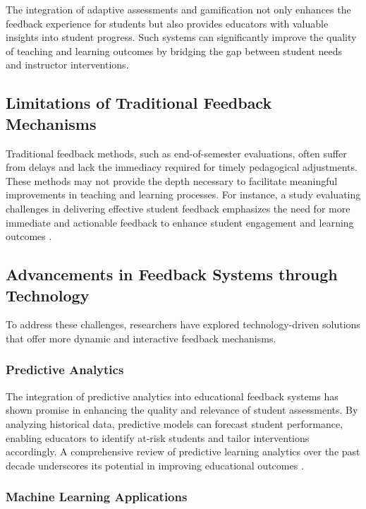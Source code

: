 \documentclass[conference]{IEEEtran}
\begin{document}
The integration of adaptive assessments and gamification not only enhances the feedback experience for students but also provides educators with valuable insights into student progress. Such systems can significantly improve the quality of teaching and learning outcomes by bridging the gap between student needs and instructor interventions.

\subsection{Limitations of Traditional Feedback Mechanisms}

Traditional feedback methods, such as end-of-semester evaluations, often suffer from delays and lack the immediacy required for timely pedagogical adjustments. These methods may not provide the depth necessary to facilitate meaningful improvements in teaching and learning processes. For instance, a study evaluating challenges in delivering effective student feedback emphasizes the need for more immediate and actionable feedback to enhance student engagement and learning outcomes \cite{article1}.

\subsection{Advancements in Feedback Systems through Technology}

To address these challenges, researchers have explored technology-driven solutions that offer more dynamic and interactive feedback mechanisms.

\subsubsection{Predictive Analytics}

The integration of predictive analytics into educational feedback systems has shown promise in enhancing the quality and relevance of student assessments. By analyzing historical data, predictive models can forecast student performance, enabling educators to identify at-risk students and tailor interventions accordingly. A comprehensive review of predictive learning analytics over the past decade underscores its potential in improving educational outcomes \cite{Sghir2023}.

\subsubsection{Machine Learning Applications}
\end{document}

